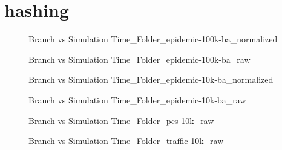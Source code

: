 \section{hashing}
\begin{figure}[H]
\centering

\caption{Branch vs Simulation Time\_Folder\_epidemic-100k-ba\_normalized}
\end{figure}
\vspace{1cm}
\begin{figure}[H]
\centering

\caption{Branch vs Simulation Time\_Folder\_epidemic-100k-ba\_raw}
\end{figure}
\vspace{1cm}
\newpage
\begin{figure}[H]
\centering

\caption{Branch vs Simulation Time\_Folder\_epidemic-10k-ba\_normalized}
\end{figure}
\vspace{1cm}
\begin{figure}[H]
\centering

\caption{Branch vs Simulation Time\_Folder\_epidemic-10k-ba\_raw}
\end{figure}
\vspace{1cm}
\newpage
\begin{figure}[H]
\centering

\caption{Branch vs Simulation Time\_Folder\_pcs-10k\_raw}
\end{figure}
\vspace{1cm}
\begin{figure}[H]
\centering

\caption{Branch vs Simulation Time\_Folder\_traffic-10k\_raw}
\end{figure}
\vspace{1cm}
\newpage

